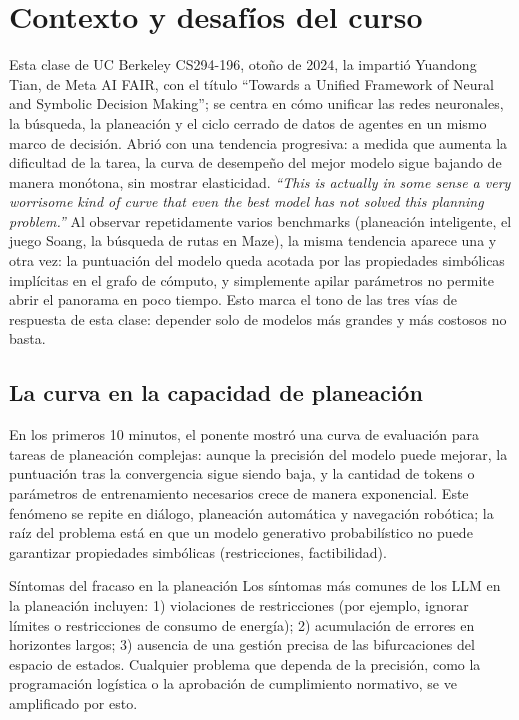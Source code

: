 \section{Contexto y desafíos del curso}

Esta clase de UC Berkeley CS294-196, otoño de 2024, la impartió Yuandong Tian, de Meta AI FAIR, con el título ``Towards a Unified Framework of Neural and Symbolic Decision Making''; se centra en cómo unificar las redes neuronales, la búsqueda, la planeación y el ciclo cerrado de datos de agentes en un mismo marco de decisión.
Abrió con una tendencia progresiva: a medida que aumenta la dificultad de la tarea, la curva de desempeño del mejor modelo sigue bajando de manera monótona, sin mostrar elasticidad.
\textit{``This is actually in some sense a very worrisome kind of curve that even the best model has not solved this planning problem.''}
Al observar repetidamente varios benchmarks (planeación inteligente, el juego Soang, la búsqueda de rutas en Maze), la misma tendencia aparece una y otra vez: la puntuación del modelo queda acotada por las propiedades simbólicas implícitas en el grafo de cómputo, y simplemente apilar parámetros no permite abrir el panorama en poco tiempo.
Esto marca el tono de las tres vías de respuesta de esta clase: depender solo de modelos más grandes y más costosos no basta.

\subsection{La curva en la capacidad de planeación}

En los primeros 10 minutos, el ponente mostró una curva de evaluación para tareas de planeación complejas: aunque la precisión del modelo puede mejorar, la puntuación tras la convergencia sigue siendo baja, y la cantidad de tokens o parámetros de entrenamiento necesarios crece de manera exponencial.
Este fenómeno se repite en diálogo, planeación automática y navegación robótica; la raíz del problema está en que un modelo generativo probabilístico no puede garantizar propiedades simbólicas (restricciones, factibilidad).
\begin{knowledgebox}{Síntomas del fracaso en la planeación}
Los síntomas más comunes de los LLM en la planeación incluyen: 1) violaciones de restricciones (por ejemplo, ignorar límites o restricciones de consumo de energía); 2) acumulación de errores en horizontes largos; 3) ausencia de una gestión precisa de las bifurcaciones del espacio de estados. Cualquier problema que dependa de la precisión, como la programación logística o la aprobación de cumplimiento normativo, se ve amplificado por esto.
\end{knowledgebox}

